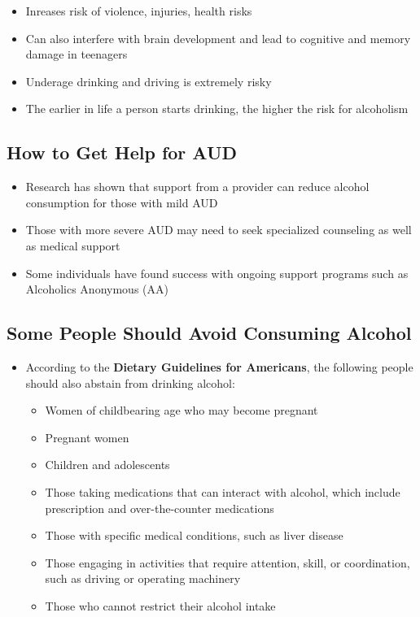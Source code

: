 \documentclass[12pt]{article}
\begin{document}
\begin{itemize}
                    \begin{itemize}
                        \item Inreases risk of violence, injuries, health risks
                        \item Can also interfere with brain development and lead to cognitive and memory damage in teenagers
                        \item Underage drinking and driving is extremely risky
                        \item The earlier in life a person starts drinking, the higher the risk for alcoholism
                    \end{itemize}
            \end{itemize}

        \subsection{How to Get Help for AUD}
            \begin{itemize}
                \item Research has shown that support from a provider can reduce alcohol consumption for those with mild AUD
                \item Those with more severe AUD may need to seek specialized counseling as well as medical support
                \item Some individuals have found success with ongoing support programs such as Alcoholics Anonymous (AA)
            \end{itemize}
        
        \subsection{Some People Should Avoid Consuming Alcohol}
            \begin{itemize}
                \item According to the \textbf{Dietary Guidelines for Americans}, the following people should also abstain from drinking alcohol:
                    \begin{itemize}
                        \item Women of childbearing age who may become pregnant
                        \item Pregnant women
                        \item Children and adolescents
                        \item Those taking medications that can interact with alcohol, which include prescription and over-the-counter medications
                        \item Those with specific medical conditions, such as liver disease
                        \item Those engaging in activities that require attention, skill, or coordination, such as driving or operating machinery
                        \item Those who cannot restrict their alcohol intake
                    \end{itemize}
            \end{itemize}
\end{document}
